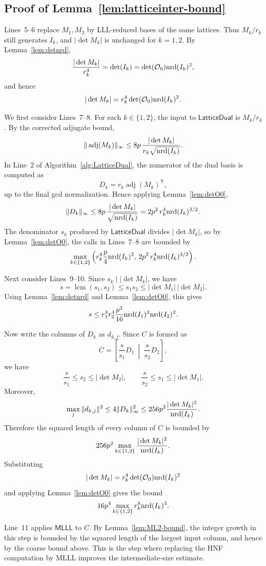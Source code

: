\subsection{Proof of Lemma~\ref{lem:latticeinter-bound}}
\label{subsec:latticeinter-bound}

Lines~5--6 replace \(M_1,M_2\) by LLL-reduced bases of the same lattices.
Thus \(M_k/r_k\) still generates \(I_k\), and \(|\det M_k|\) is unchanged for
\(k=1,2\).  By Lemma~\ref{lem:detnrd},
\[
  \frac{|\det M_k|}{r_k^4}
  =
  \det(I_k)
  =
  \det(\mathcal{O}_0)\mathrm{nrd}(I_k)^2,
\]
and hence
\[
  |\det M_k|
  =
  r_k^4\det(\mathcal{O}_0)\mathrm{nrd}(I_k)^2.
\]

We first consider Lines~7--8.  For each \(k\in\{1,2\}\), the input to
\(\mathsf{LatticeDual}\) is \(M_k/r_k\).  By the corrected adjugate bound,
\[
  \|\operatorname{adj}(M_k)\|_\infty
  \le
  8p\,\frac{|\det M_k|}{r_k\sqrt{\mathrm{nrd}(I_k)}}.
\]
In Line~2 of Algorithm~\ref{alg:LatticeDual}, the numerator of the dual basis is
computed as
\[
  D_k = r_k\operatorname{adj}(M_k)^{\mathsf T},
\]
up to the final gcd normalization.
Hence applying Lemma~\ref{lem:detO0},
\[
  \|D_k\|_\infty
  \le
  8p\,\frac{|\det M_k|}{\sqrt{\mathrm{nrd}(I_k)}}
  =
  2p^2\,r_k^4\mathrm{nrd}(I_k)^{3/2}.
\]
The denominator \(s_k\) produced by \(\mathsf{LatticeDual}\) divides
\(|\det M_k|\), so by Lemma~\ref{lem:detO0}, the calls in Lines~7--8 are bounded by
\[
  \max_{k\in\{1,2\}}
  \left(
    r_k^4\frac{p}{4}\mathrm{nrd}(I_k)^2,\,
    2p^2\,r_k^4\mathrm{nrd}(I_k)^{3/2}
  \right).
\]

Next consider Lines~9--10.  Since \(s_k\mid |\det M_k|\), we have
\[
  s=\operatorname{lcm}(s_1,s_2)
  \le
  s_1s_2
  \le
  |\det M_1|\,|\det M_2|.
\]
Using Lemma~\ref{lem:detnrd} and Lemma~\ref{lem:detO0}, this gives
\[
  s
  \le
  r_1^4r_2^4\frac{p^2}{16}
  \mathrm{nrd}(I_1)^2\mathrm{nrd}(I_2)^2.
\]

Now write the columns of \(D_k\) as \(d_{k,j}\).  Since \(C\) is formed as
\[
  C=
  \left[
    \frac{s}{s_1}D_1\ \middle|\ \frac{s}{s_2}D_2
  \right],
\]
we have
\[
  \frac{s}{s_1}\le s_2\le |\det M_2|,
  \qquad
  \frac{s}{s_2}\le s_1\le |\det M_1|.
\]
Moreover,
\[
  \max_j\|d_{k,j}\|^2
  \le
  4\|D_k\|_\infty^2
  \le
  256p^2\frac{|\det M_k|^2}{\mathrm{nrd}(I_k)}.
\]
Therefore the squared length of every column of \(C\) is bounded by
\[
  256p^2\max_{k\in\{1,2\}}\frac{|\det M_k|^2}{\mathrm{nrd}(I_k)}.
\]
Substituting
\[
  |\det M_k|=r_k^4\det(\mathcal{O}_0)\mathrm{nrd}(I_k)^2
\]
and applying Lemma~\ref{lem:detO0} gives the bound
\[
  16p^4\max_{k\in\{1,2\}} r_k^8\mathrm{nrd}(I_k)^3.
\]

Line~11 applies \(\mathsf{MLLL}\) to \(C\).  By Lemma~\ref{lem:ML2-bound}, the
integer growth in this step is bounded by the squared length of the largest input
column, and hence by the coarse bound above.  This is the step where replacing the
HNF computation by MLLL improves the intermediate-size estimate.

